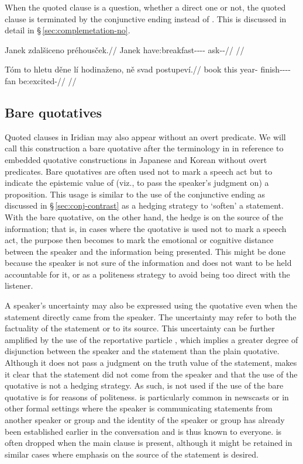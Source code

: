 When the quoted clause is a question, whether a direct one or not, the quoted
clause is terminated by the conjunctive ending  instead of .
This is discussed in detail in \S\,\ref{sec:complemetation-no}.

\pex
\begingl
  \gla Janek zdalšiceno préhousček.//
  \glb Janek have:breakfast-\Av{}-\Pf{}-\Cnj{}-\Comp{} ask-\Av{}-\Pf{}//
  \glft {}//
\endgl
\xe

\pex
\begingl
  \gla Tóm to hletu děne lí hodinaženo, ně svad postupeví.//
  \glb book this year-\Ins{} \Spec{} \Q{} finish-\Pv{}-\Ctp{}-\Cnj{}-\Comp{} \Pl{} fan be:excited-\Cont{}//
  \glft {}//
\endgl
\xe

\subsection{Bare quotatives}

Quoted clauses in Iridian may also appear without an overt predicate. We will
call this construction a {\sc bare quotative} after the terminology in
\textcite{tomioka2019} in reference to embedded quotative constructions in
Japanese and Korean without overt predicates. Bare quotatives are often used not
to mark a speech act but to indicate the epistemic value of (viz., to pass the
speaker's judgment on) a proposition. This usage is similar to the use of the
conjunctive ending  as discussed in \S\,\ref{sec:conj-contrast} as a
hedging strategy to `soften' a statement. With the bare quotative, on the other
hand, the hedge is on the source of the information; that is, in cases where the
quotative is used not to mark a speech act, the purpose then becomes to mark the
emotional or cognitive distance between the speaker and the information being
presented. This might be done because the speaker is not sure of the information
and does not want to be held accountable for it, or as a politeness strategy to
avoid being too direct with the listener.

A speaker's uncertainty may also be expressed using the quotative even when the
statement directly came from the speaker. The uncertainty may refer to both the
factuality of the statement or to its source. This uncertainty can be further
amplified by the use of the reportative particle , which implies a
greater degree of disjunction between the speaker and the statement than the
plain quotative. Although it does not pass a judgment on the truth value of the
statement,  makes it clear that the statement did not come from the
speaker and that the use of the quotative is not a hedging strategy. As such,
 is not used if the use of the bare quotative is for reasons of
politeness.  is particularly common in newscasts or in other formal
settings where the speaker is communicating statements from another speaker or
group and the identity of the speaker or group has already been established
earlier in the conversation and is thus known to everyone.  is often
dropped when the main clause is present, although it might be retained in
similar cases where emphasis on the source of the statement is desired.

